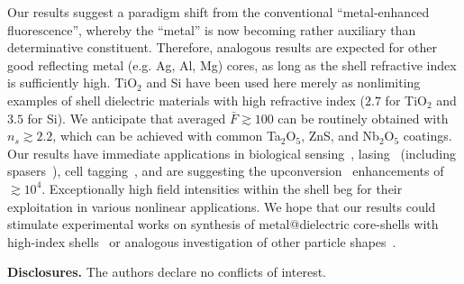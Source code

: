 \documentclass[9pt,twocolumn,twoside]{osajnl}
\begin{document}
Our results suggest a paradigm shift from the conventional ``metal-enhanced fluorescence'', whereby the ``metal'' is now becoming rather auxiliary than determinative constituent. 
Therefore, analogous results are expected for other good reflecting metal (e.g. Ag, Al, Mg) cores, as long as the shell refractive index is sufficiently high. TiO$_2$ and Si have been used here merely as nonlimiting examples of shell dielectric materials with high refractive index ($2.7$ for TiO$_2$ and $3.5$ for Si). 
We anticipate that averaged $\bar F\gtrsim 100$ can be routinely obtained with $n_s\gtrsim 2.2$, which can be achieved with common Ta${}_2$O${}_5$, ZnS, and Nb${}_2$O${}_5$ coatings.
Our results have immediate applications in biological sensing~\cite{Zhang2017c}, lasing~\cite{Mamonov2018} (including spasers~\cite{Bergman2003}), cell tagging~\cite{Humar2017}, and are suggesting the upconversion~\cite{Fernandez-Bravo2018,Liu2020d} enhancements of $\gtrsim 10^4$. Exceptionally high field intensities within the shell beg for their exploitation in various nonlinear applications. We hope that our results could stimulate experimental works on synthesis of metal@dielectric core-shells with high-index shells~\cite{Mohapatra2008} or analogous investigation of other particle shapes~\cite{Abadeer2014,Pavelka2021}.

\textbf{Disclosures.} The authors declare no conflicts of interest.


% 
\end{document}
